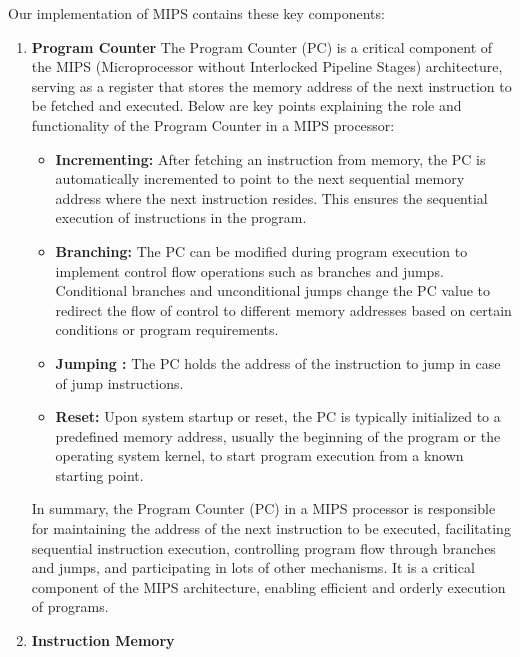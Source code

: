 \documentclass{article}
\begin{document}
		Our implementation of MIPS contains these key components:
		\begin{enumerate}
			\item \textbf{Program Counter} The Program Counter (PC) is a critical component of the MIPS (Microprocessor without Interlocked Pipeline Stages) architecture, serving as a register that stores the memory address of the next instruction to be fetched and executed. Below are key points explaining the role and functionality of the Program Counter in a MIPS processor:
			
			\begin{itemize}
				
				
				
				\item \textbf{Incrementing:} After fetching an instruction from memory, the PC is automatically incremented to point to the next sequential memory address where the next instruction resides. This ensures the sequential execution of instructions in the program.
				
				\item \textbf{Branching:} The PC can be modified during program execution to implement control flow operations such as branches and jumps. Conditional branches and unconditional jumps change the PC value to redirect the flow of control to different memory addresses based on certain conditions or program requirements.
				
				\item \textbf{Jumping :} The PC holds the address of the instruction to jump in case of jump instructions.
				
				
				
				\item \textbf{Reset:} Upon system startup or reset, the PC is typically initialized to a predefined memory address, usually the beginning of the program or the operating system kernel, to start program execution from a known starting point.
			\end{itemize}
			
			In summary, the Program Counter (PC) in a MIPS processor is responsible for maintaining the address of the next instruction to be executed, facilitating sequential instruction execution, controlling program flow through branches and jumps, and participating in lots of other mechanisms. It is a critical component of the MIPS architecture, enabling efficient and orderly execution of programs.
			\item \textbf{Instruction Memory}
			

\end{enumerate}
\end{document}
